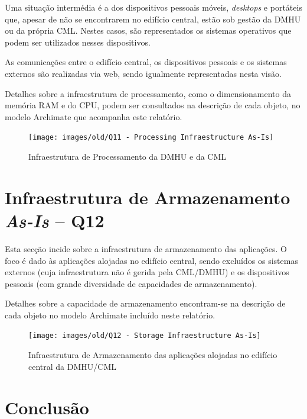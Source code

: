 \documentclass[12pt,a4paper,final]{article}
\begin{document}
    Uma situação intermédia é a dos dispositivos pessoais móveis, \textit{desktops} e portáteis que, apesar de não se encontrarem no edifício central, estão sob gestão da DMHU ou da própria CML. Nestes casos, são representados os sistemas operativos que podem ser utilizados nesses dispositivos.

    As comunicações entre o edifício central, os dispositivos pessoais e os sistemas externos são realizadas via web, sendo igualmente representadas nesta visão.

    Detalhes sobre a infraestrutura de processamento, como o dimensionamento da memória RAM e do CPU, podem ser consultados na descrição de cada objeto, no modelo Archimate que acompanha este relatório.

    \begin{figure}[H]
        \centering
        \texttt{[image: images/old/Q11 - Processing Infraestructure As-Is]}
        \caption{Infraestrutura de Processamento da DMHU e da CML}
        \label{fig:infra_proc}
    \end{figure}

    \section{Infraestrutura de Armazenamento \textit{As-Is} – Q12}\label{sec:infra-estrutura-de-armazenamento-textit{as-is}--q12}

    Esta secção incide sobre a infraestrutura de armazenamento das aplicações.
    O foco é dado às aplicações alojadas no edifício central, sendo excluídos os sistemas externos (cuja infraestrutura não é gerida pela CML/DMHU) e os dispositivos pessoais (com grande diversidade de capacidades de armazenamento).

    Detalhes sobre a capacidade de armazenamento encontram-se na descrição de cada objeto no modelo Archimate incluído neste relatório.

    \begin{figure}[H]
        \centering
        \texttt{[image: images/old/Q12 - Storage Infraestructure As-Is]}
        \caption{Infraestrutura de Armazenamento das aplicações alojadas no edifício central da DMHU/CML}
        \label{fig:infra_storage}
    \end{figure}

    \section{Conclusão}\label{sec:conclusao}
\end{document}
